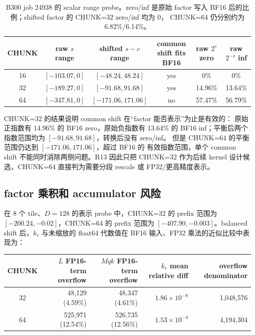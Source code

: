 \begin{table}[htbp]
\centering
\small
\begin{tabular}{@{}c c c c c c@{}}
\toprule
CHUNK & raw \(s\) range & shifted \(s-c\) range & common shift fits BF16
  & raw \(2^s\) zero & raw \(2^{-s}\) inf \\
\midrule
16 & \([-103.07,0]\) & \([-48.24,48.24]\) & yes & 0\% & 0\% \\
32 & \([-189.27,0]\) & \([-91.68,91.68]\) & yes & 14.96\% & 13.64\% \\
64 & \([-347.81,0]\) & \([-171.06,171.06]\) & no & 57.47\% & 56.79\% \\
\bottomrule
\end{tabular}
\caption{B300 job 24938 的 scalar range probe。zero/inf 是原始 factor
写入 BF16 后的比例；shifted factor 的 CHUNK=32 zero/inf 均为 0，
CHUNK=64 仍分别约为 6.82\%/6.14\%。}
\end{table}

CHUNK=32 的结果说明 common shift 在“factor 能否表示”为止是有效的：
原始正指数有 14.96\% 的 BF16 zero，原始负指数有 13.64\% 的 BF16
inf；平衡后两个指数范围均为 \([-91.68,91.68]\)，转换后没有 zero/inf。
但是 CHUNK=64 的平衡范围仍达到 \([-171.06,171.06]\)，超过 BF16 的
有效指数范围，单个 common shift 不能同时消除两侧问题。R13 因此只把
CHUNK=32 作为后续 kernel 设计候选，CHUNK=64 直接判为需要分段 rescale
或 FP32/更高精度表示。

\subsection{factor 乘积和 accumulator 风险}

在 8 个 tile、\(D=128\) 的表示 probe 中，CHUNK=32 的 prefix 范围为
\([-200.24,-0.02]\)，CHUNK=64 的 prefix 范围为
\([-407.90,-0.003]\)。balanced shift 后，\(k_r\) 与未缩放的 float64
代数值在 BF16 输入、FP32 乘法的近似比较中表现为：

\begin{center}
\small
\begin{tabular}{@{}c r r r r@{}}
\toprule
CHUNK & \(L\) FP16-term overflow & \(Mqk\) FP16-term overflow
  & \(k_r\) mean relative diff & overflow denominator \\
\midrule
32 & 48,129 (4.59\%) & 48,347 (4.61\%)
  & \(1.86\times10^{-8}\) & 1,048,576 \\
64 & 525,971 (12.54\%) & 526,735 (12.56\%)
  & \(1.53\times10^{-4}\) & 4,194,304 \\
\bottomrule
\end{tabular}
\end{center}


